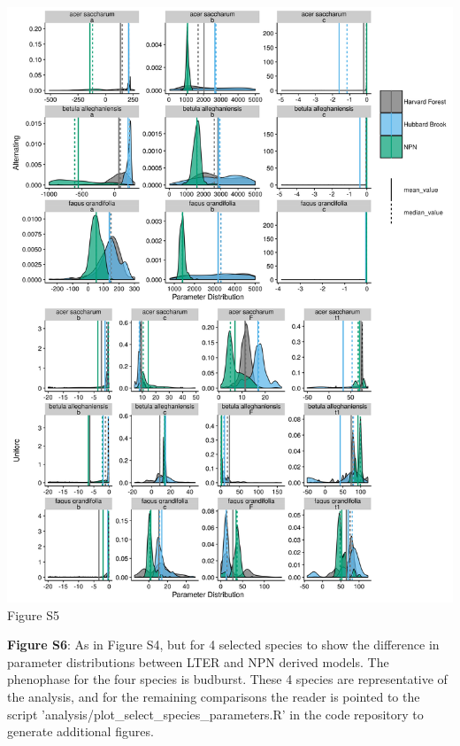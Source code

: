 \documentclass[a4paper,12pt]{article}
\begin{document}
\newpage

\begin{center}
	\centering
		\includegraphics[scale=0.5]{supplement_hubbard_harvard_comparison2.png}
	Figure S5
\end{center}

\newpage

\textbf{Figure S6}: As in Figure S4, but for 4 selected species to show the difference in parameter distributions between LTER and NPN derived models. The phenophase for the four species is budburst. These 4 species are representative of the analysis, and for the remaining comparisons the reader is pointed to the script 'analysis/plot\_select\_species\_parameters.R' in the code repository to generate additional figures.

\newpage
\end{document}
